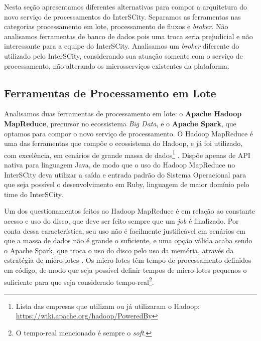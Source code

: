 Nesta seção apresentamos diferentes alternativas para compor a arquitetura do
novo serviço de processamentos do InterSCity. Separamos as ferramentas
nas categorias processamento em lote, processamento de fluxos
e \textit{broker}. Não analisamos ferramentas de banco de dados pois
uma troca seria prejudicial e não interessante para a equipe do InterSCity.
Analisamos um \textit{broker} diferente do utilizado pelo InterSCity,
considerando sua atuação somente com o serviço de processamento, não alterando
os microsserviços existentes da plataforma.

\subsection{Ferramentas de Processamento em Lote}

Analisamos duas ferramentas de processamento em lote: o \textbf{Apache
Hadoop MapReduce}, precursor no ecossistema \textit{Big Data}, e o
\textbf{Apache Spark}, que optamos para compor o novo serviço de processamento.
O Hadoop MapReduce é uma das ferramentas que compõe o ecossistema do Hadoop, e
já foi utilizado, com excelência, em cenários de grande massa de
dados\footnote{Lista das empresas que utilizam ou já utilizaram o Hadoop:
\url{https://wiki.apache.org/hadoop/PoweredBy}} \cite{zaharia2008}.
Dispõe apenas de API nativa para linguagem Java, de modo que o uso do Hadoop
MapReduce no InterSCity deva utilizar a saída e entrada padrão do
Sistema Operacional para que seja possível o desenvolvimento em Ruby, linguagem
de maior domínio pelo time do InterSCity.

Um dos questionamentos feitos ao Hadoop MapReduce é em relação ao constante acesso e
uso do disco, que deve ser feito sempre que um \textit{job} é finalizado. Por
conta dessa característica, seu uso não é facilmente justificável em cenários em
que a massa de dados não é grande o suficiente, e uma opção válida acaba sendo
o Apache Spark, que troca o uso do disco pelo uso da memória, através da estratégia
de micro-lotes \cite{arsalan2014}. Os micro-lotes têm tempo de processamento
definidos em código, de modo que seja possível definir tempos de
micro-lotes pequenos o suficiente para que seja considerado
tempo-real\footnote{O tempo-real mencionado é sempre o \textit{soft}.}.

